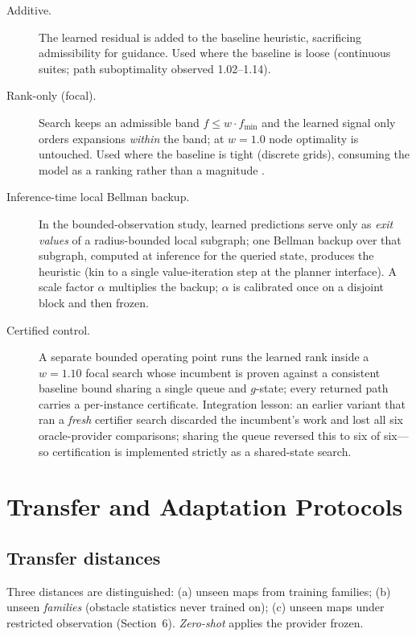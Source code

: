 \documentclass[11pt,letterpaper]{article}
\begin{document}
\begin{description}
  \item[Additive.] The learned residual is added to the baseline heuristic, sacrificing admissibility for guidance. Used where the baseline is loose (continuous suites; path suboptimality observed 1.02--1.14).
  \item[Rank-only (focal).] Search keeps an admissible band $f \leq w \cdot f_{\min}$ \citep{pearl1982semiadmissible,pohl1970} and the learned signal only orders expansions \emph{within} the band; at $w{=}1.0$ node optimality is untouched. Used where the baseline is tight (discrete grids), consuming the model as a ranking rather than a magnitude \citep{chrestien2023rank}.
  \item[Inference-time local Bellman backup.] In the bounded-observation study, learned predictions serve only as \emph{exit values} of a radius-bounded local subgraph; one Bellman backup over that subgraph, computed at inference for the queried state, produces the heuristic (kin to a single value-iteration step \citep{tamar2016vin} at the planner interface). A scale factor $\alpha$ multiplies the backup; $\alpha$ is calibrated once on a disjoint block and then frozen.
  \item[Certified control.] A separate bounded operating point runs the learned rank inside a $w{=}1.10$ focal search whose incumbent is proven against a consistent baseline bound sharing a single queue and $g$-state; every returned path carries a per-instance certificate. Integration lesson: an earlier variant that ran a \emph{fresh} certifier search discarded the incumbent's work and lost all six oracle-provider comparisons; sharing the queue reversed this to six of six---so certification is implemented strictly as a shared-state search.
\end{description}

\section{Transfer and Adaptation Protocols}

\subsection{Transfer distances}
Three distances are distinguished: (a) unseen maps from training families; (b) unseen \emph{families} (obstacle statistics never trained on); (c) unseen maps under restricted observation (Section~6). \emph{Zero-shot} applies the provider frozen.
\end{document}

